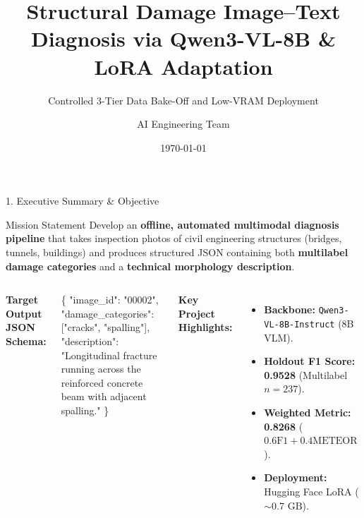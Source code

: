 \documentclass[aspectratio=169]{beamer}
\title[Structural Damage VLM Diagnosis]{Structural Damage Image--Text Diagnosis via Qwen3-VL-8B \& LoRA Adaptation}
\subtitle{Controlled 3-Tier Data Bake-Off and Low-VRAM Deployment}
\author[Project Team]{AI Engineering Team}
\institute[Civil AI Lab]{Department of Computer Science \& Civil Engineering}
\date{\today}
\begin{document}
\begin{frame}
  \titlepage
\end{frame}

\begin{frame}{1. Executive Summary \& Objective}
  \begin{block}{Mission Statement}
    Develop an \textbf{offline, automated multimodal diagnosis pipeline} that takes inspection photos of civil engineering structures (bridges, tunnels, buildings) and produces structured JSON containing both \textbf{multilabel damage categories} and a \textbf{technical morphology description}.
  \end{block}
  \vspace{0.3cm}
  \begin{columns}
    \textbf{Target Output JSON Schema:}
    \begin{semiverbatim}\tiny
\{
  "image_id": "00002",
  "damage_categories": ["cracks", "spalling"],
  "description": "Longitudinal fracture running across 
    the reinforced concrete beam with adjacent spalling."
\}
    \end{semiverbatim}
    \textbf{Key Project Highlights:}
    \begin{itemize}
      \item \textbf{Backbone:} \texttt{Qwen3-VL-8B-Instruct} (8B VLM).
      \item \textbf{Holdout F1 Score:} \textbf{0.9528} (Multilabel $n=237$).
      \item \textbf{Weighted Metric:} \textbf{0.8268} ($0.6 \text{F1} + 0.4 \text{METEOR}$).
      \item \textbf{Deployment:} Hugging Face LoRA ($\sim 0.7\text{ GB}$).
    \end{itemize}
  \end{columns}
\end{frame}
\end{document}
